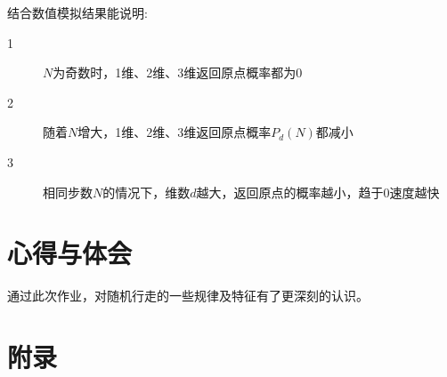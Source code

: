 \documentclass[a4paper,11pt]{article}
\begin{document}
结合数值模拟结果能说明:
\begin{description}
\item[1] $N$为奇数时，1维、2维、3维返回原点概率都为0
\item[2]随着$N$增⼤，1维、2维、3维返回原点概率$P_{d}(N)$都减⼩
\item[3]相同步数$N$的情况下，维数$d$越⼤，返回原点的概率越⼩，趋于$0$速度越快
\end{description}


\section{心得与体会}
通过此次作业，对随机行走的一些规律及特征有了更深刻的认识。


\newpage
\section{附录}
\end{document}
